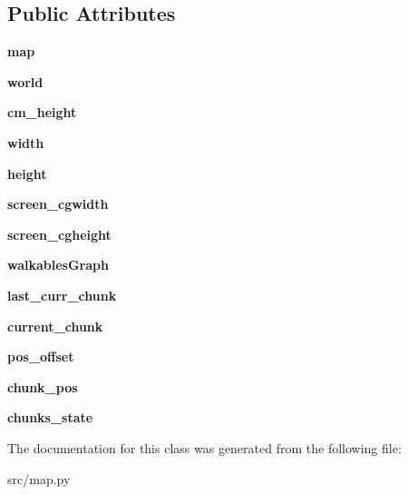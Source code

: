 \subsection*{Public Attributes}
\begin{DoxyCompactItemize}
\item 
\hypertarget{classsrc_1_1map_1_1_map_viewer_a702c2b0bb2a4df6eb5f22dbfba799369}{}\label{classsrc_1_1map_1_1_map_viewer_a702c2b0bb2a4df6eb5f22dbfba799369} 
{\bfseries map}
\item 
\hypertarget{classsrc_1_1map_1_1_map_viewer_a217ce25a1587f16509865b086ac51454}{}\label{classsrc_1_1map_1_1_map_viewer_a217ce25a1587f16509865b086ac51454} 
{\bfseries world}
\item 
\hypertarget{classsrc_1_1map_1_1_map_viewer_af5451ec6a0252e5590cfaa271d6e4d61}{}\label{classsrc_1_1map_1_1_map_viewer_af5451ec6a0252e5590cfaa271d6e4d61} 
{\bfseries cm\+\_\+height}
\item 
\hypertarget{classsrc_1_1map_1_1_map_viewer_a56be3ef421e56ad0a29c13930d319cc2}{}\label{classsrc_1_1map_1_1_map_viewer_a56be3ef421e56ad0a29c13930d319cc2} 
{\bfseries width}
\item 
\hypertarget{classsrc_1_1map_1_1_map_viewer_abdf0f05e43205171aac5d74d080fc894}{}\label{classsrc_1_1map_1_1_map_viewer_abdf0f05e43205171aac5d74d080fc894} 
{\bfseries height}
\item 
\hypertarget{classsrc_1_1map_1_1_map_viewer_a148f1716857871c87a28e37544243e58}{}\label{classsrc_1_1map_1_1_map_viewer_a148f1716857871c87a28e37544243e58} 
{\bfseries screen\+\_\+cgwidth}
\item 
\hypertarget{classsrc_1_1map_1_1_map_viewer_aad33faf54cefc012135deab033bd578c}{}\label{classsrc_1_1map_1_1_map_viewer_aad33faf54cefc012135deab033bd578c} 
{\bfseries screen\+\_\+cgheight}
\item 
\hypertarget{classsrc_1_1map_1_1_map_viewer_a94451b88e0af34e7cfade74c1dac2703}{}\label{classsrc_1_1map_1_1_map_viewer_a94451b88e0af34e7cfade74c1dac2703} 
{\bfseries walkables\+Graph}
\item 
\hypertarget{classsrc_1_1map_1_1_map_viewer_a5af3e9d6aeb49f50ecf45fab4c00d887}{}\label{classsrc_1_1map_1_1_map_viewer_a5af3e9d6aeb49f50ecf45fab4c00d887} 
{\bfseries last\+\_\+curr\+\_\+chunk}
\item 
\hypertarget{classsrc_1_1map_1_1_map_viewer_a43915e33c2af0c8971f8015d992e3264}{}\label{classsrc_1_1map_1_1_map_viewer_a43915e33c2af0c8971f8015d992e3264} 
{\bfseries current\+\_\+chunk}
\item 
\hypertarget{classsrc_1_1map_1_1_map_viewer_a01616151b7b48544b522a15489098a44}{}\label{classsrc_1_1map_1_1_map_viewer_a01616151b7b48544b522a15489098a44} 
{\bfseries pos\+\_\+offset}
\item 
\hypertarget{classsrc_1_1map_1_1_map_viewer_ab953e965cbc43c62c7a0a412ba79f2a5}{}\label{classsrc_1_1map_1_1_map_viewer_ab953e965cbc43c62c7a0a412ba79f2a5} 
{\bfseries chunk\+\_\+pos}
\item 
\hypertarget{classsrc_1_1map_1_1_map_viewer_a3f4ddfd4f1401f496a653d78b3adea55}{}\label{classsrc_1_1map_1_1_map_viewer_a3f4ddfd4f1401f496a653d78b3adea55} 
{\bfseries chunks\+\_\+state}
\end{DoxyCompactItemize}


The documentation for this class was generated from the following file\+:\begin{DoxyCompactItemize}
\item 
src/map.\+py\end{DoxyCompactItemize}
